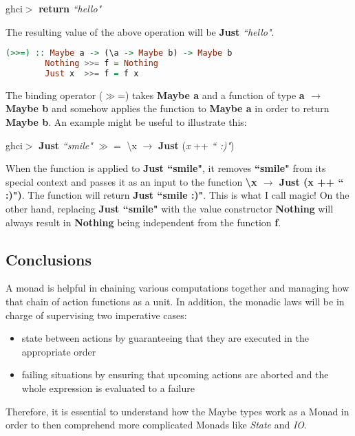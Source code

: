 \documentclass[a4paper, onecolumn]{article}
\begin{document}
    \begin{center}
        ghci$>$ \textbf{return} \textit{``hello"}
    \end{center}
    The resulting value of the above operation will be \textbf{Just} \textit{``hello"}.
    \begin{tcolorbox}
    \begin{lstlisting}[language=Haskell]
        (>>=) :: Maybe a -> (\a -> Maybe b) -> Maybe b
        Nothing >>= f = Nothing
        Just x  >>= f = f x
    \end{lstlisting}
    \end{tcolorbox}
    The binding operator ($\gg$=) takes \textbf{Maybe a} and a function of type \textbf{a $\rightarrow$ Maybe b} and somehow applies the function to \textbf{Maybe a} in order to return \textbf{Maybe b}. An example might be useful to illustrate this: 
    \begin{center}
    ghci$>$ \textbf{Just} \textit{``smile"} $\gg=$ \textbackslash x $\rightarrow$ \textbf{Just} (\textit{x} ++ \textit{`` :)"})
    \end{center}
    When the function is applied to \textbf{Just ``smile"}, it removes \textbf{``smile"} from its special context and passes it as an input to the function \textbf{\textbackslash x $\rightarrow$ Just (x ++ `` :)")}.  The function will return \textbf{Just ``smile :)"}. This is what I call magic! On the other hand, replacing \textbf{Just ``smile"} with the value constructor \textbf{Nothing} will always result in \textbf{Nothing} being independent from the function \textbf{f}.
    
    
    \subsection{Conclusions}
    A monad is helpful in chaining various computations together and managing how that chain of action functions as a unit. In addition, the monadic laws will be in charge of supervising two imperative cases:
    
    \begin{itemize}
        \item state between actions by guaranteeing that they are executed in the appropriate order 
        \item failing situations by ensuring that upcoming actions are aborted and the whole expression is evaluated to a failure
    \end{itemize}
    Therefore, it is essential to understand how the Maybe types work as a Monad in order to then comprehend more complicated Monads like \textit{State} and \textit{IO}.
    
\end{document}
